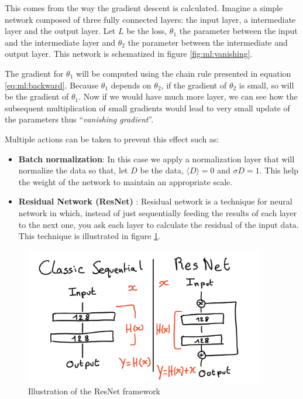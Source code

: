 \documentclass[../main.tex]{subfiles}
\begin{document}
This comes from the way the gradient descent is calculated. Imagine a simple network composed of three fully connected layers: the input layer, a intermediate layer and the output layer. Let $L$ be the loss, $\theta_1$ the parameter between the input and the intermediate layer and $\theta_2$ the parameter between the intermediate and output layer. This network is schematized in figure \ref{fig:ml:vanishing}.

The gradient for $\theta_1$ will be computed using the chain rule presented in equation \ref{eq:ml:backward}. Because $\theta_1$ depends on $\theta_2$, if the gradient of $\theta_2$ is small, so will be the gradient of $\theta_1$. Now if we would have much more layer, we can see how the subsequent multiplication of small gradients would lead to very small update of the parameters thus ``\textit{vanishing gradient}''.

Multiple actions can be taken to prevent this effect such as:
\begin{itemize}
  \item \textbf{Batch normalization}: In this case we apply a normalization layer that will normalize the data so that, let $D$ be the data, $\langle D \rangle = 0$ and $\sigma D = 1$. This help the weight of the network to maintain an appropriate scale.
  \item \textbf{Residual Network (ResNet)} \cite{he_deep_2016}: Residual network is a technique for neural network in which, instead of just sequentially feeding the results of each layer to the next one, you ask each layer to calculate the residual of the input data. This technique is illustrated in figure \ref{fig:ml:resnet}.
\end{itemize}


\begin{figure}[ht]
  \centering
  \includegraphics[height=6cm]{images/ml/resnet.jpg}
  \caption{Illustration of the ResNet framework}
  \label{fig:ml:resnet}
\end{figure}
\end{document}

